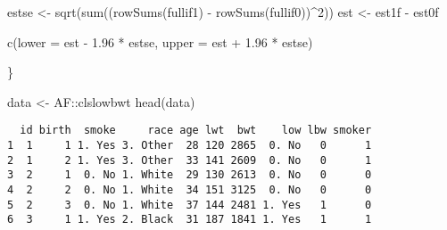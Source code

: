 \documentclass[
  letterpaper,
  DIV=11,
  numbers=noendperiod]{scrartcl}
\newenvironment{Shaded}{\begin{snugshade}}{\end{snugshade}}
\newcommand{\AttributeTok}[1]{\textcolor[rgb]{0.40,0.45,0.13}{#1}}
\newcommand{\DecValTok}[1]{\textcolor[rgb]{0.68,0.00,0.00}{#1}}
\newcommand{\FloatTok}[1]{\textcolor[rgb]{0.68,0.00,0.00}{#1}}
\newcommand{\FunctionTok}[1]{\textcolor[rgb]{0.28,0.35,0.67}{#1}}
\newcommand{\NormalTok}[1]{\textcolor[rgb]{0.00,0.23,0.31}{#1}}
\newcommand{\OtherTok}[1]{\textcolor[rgb]{0.00,0.23,0.31}{#1}}
\newcommand{\SpecialCharTok}[1]{\textcolor[rgb]{0.37,0.37,0.37}{#1}}
\begin{document}
\begin{Shaded}
\begin{Highlighting}[]
  
\NormalTok{  estse }\OtherTok{\textless{}{-}} \FunctionTok{sqrt}\NormalTok{(}\FunctionTok{sum}\NormalTok{((}\FunctionTok{rowSums}\NormalTok{(fullif1) }\SpecialCharTok{{-}} \FunctionTok{rowSums}\NormalTok{(fullif0))}\SpecialCharTok{\^{}}\DecValTok{2}\NormalTok{))}
\NormalTok{  est }\OtherTok{\textless{}{-}}\NormalTok{ est1f }\SpecialCharTok{{-}}\NormalTok{ est0f}
  
  \FunctionTok{c}\NormalTok{(}\AttributeTok{lower =}\NormalTok{ est }\SpecialCharTok{{-}} \FloatTok{1.96} \SpecialCharTok{*}\NormalTok{ estse, }\AttributeTok{upper =}\NormalTok{ est }\SpecialCharTok{+} \FloatTok{1.96} \SpecialCharTok{*}\NormalTok{ estse)}
  
  
\NormalTok{\}}

\NormalTok{data }\OtherTok{\textless{}{-}}\NormalTok{ AF}\SpecialCharTok{::}\NormalTok{clslowbwt}
\FunctionTok{head}\NormalTok{(data)}
\end{Highlighting}
\end{Shaded}

\begin{verbatim}
  id birth  smoke     race age lwt  bwt    low lbw smoker
1  1     1 1. Yes 3. Other  28 120 2865  0. No   0      1
2  1     2 1. Yes 3. Other  33 141 2609  0. No   0      1
3  2     1  0. No 1. White  29 130 2613  0. No   0      0
4  2     2  0. No 1. White  34 151 3125  0. No   0      0
5  2     3  0. No 1. White  37 144 2481 1. Yes   1      0
6  3     1 1. Yes 2. Black  31 187 1841 1. Yes   1      1
\end{verbatim}
\end{document}
